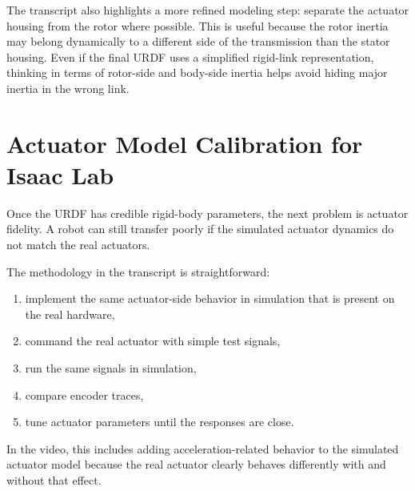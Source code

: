 \documentclass[11pt,a4paper]{article}
\begin{document}
The transcript also highlights a more refined modeling step: separate the
actuator housing from the rotor where possible.  This is useful because the
rotor inertia may belong dynamically to a different side of the transmission
than the stator housing.  Even if the final URDF uses a simplified rigid-link
representation, thinking in terms of rotor-side and body-side inertia helps
avoid hiding major inertia in the wrong link.

\section{Actuator Model Calibration for Isaac Lab}

Once the URDF has credible rigid-body parameters, the next problem is actuator
fidelity.  A robot can still transfer poorly if the simulated actuator dynamics
do not match the real actuators.

The methodology in the transcript is straightforward:
\begin{enumerate}[leftmargin=2em]
  \item implement the same actuator-side behavior in simulation that is present on the real hardware,
  \item command the real actuator with simple test signals,
  \item run the same signals in simulation,
  \item compare encoder traces,
  \item tune actuator parameters until the responses are close.
\end{enumerate}

In the video, this includes adding acceleration-related behavior to the
simulated actuator model because the real actuator clearly behaves differently
with and without that effect.
\end{document}
